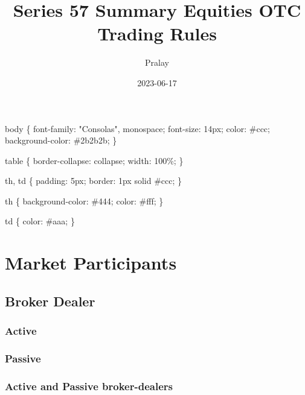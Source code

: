 \documentclass[11pt]{article}
\author{Pralay}
\date{2023-06-17}
\title{Series 57 Summary Equities OTC Trading Rules}
\begin{document}
\maketitle
\tableofcontents

body \{
font-family: "Consolas", monospace;
font-size: 14px;
color: \#ccc;
background-color: \#2b2b2b;
\}

table \{
border-collapse: collapse;
width: 100\%;
\}

th, td \{
padding: 5px;
border: 1px solid \#ccc;
\}

th \{
background-color: \#444;
color: \#fff;
\}

td \{
color: \#aaa;
\}

\section{Market Participants}
\label{sec:org44abfb9}
\subsection{Broker Dealer}
\label{sec:org9194ce3}
\subsubsection{Active}
\label{sec:org0531ca9}
\subsubsection{Passive}
\label{sec:org2dab1e8}

\subsubsection{Active and Passive broker-dealers}
\label{sec:org3fe61a2}
\end{document}
